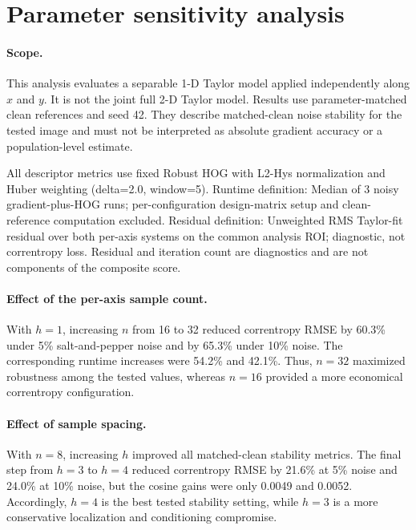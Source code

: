 \section{Parameter sensitivity analysis}
\label{sec:parameter-sensitivity}

\paragraph{Scope.}
This analysis evaluates a separable 1-D Taylor model applied independently along $x$ and $y$. It is not the joint full 2-D Taylor model. Results use parameter-matched clean references and seed 42. They describe matched-clean noise stability for the tested image and must not be interpreted as absolute gradient accuracy or a population-level estimate.

All descriptor metrics use fixed Robust HOG with L2-Hys normalization and Huber weighting (delta=2.0, window=5). Runtime definition: Median of 3 noisy gradient-plus-HOG runs; per-configuration design-matrix setup and clean-reference computation excluded. Residual definition: Unweighted RMS Taylor-fit residual over both per-axis systems on the common analysis ROI; diagnostic, not correntropy loss. Residual and iteration count are diagnostics and are not components of the composite score.

\paragraph{Effect of the per-axis sample count.}
With $h=1$, increasing $n$ from 16 to 32 reduced correntropy RMSE by 60.3\% under 5\% salt-and-pepper noise and by 65.3\% under 10\% noise. The corresponding runtime increases were 54.2\% and 42.1\%. Thus, $n=32$ maximized robustness among the tested values, whereas $n=16$ provided a more economical correntropy configuration.

\paragraph{Effect of sample spacing.}
With $n=8$, increasing $h$ improved all matched-clean stability metrics. The final step from $h=3$ to $h=4$ reduced correntropy RMSE by 21.6\% at 5\% noise and 24.0\% at 10\% noise, but the cosine gains were only 0.0049 and 0.0052. Accordingly, $h=4$ is the best tested stability setting, while $h=3$ is a more conservative localization and conditioning compromise.

